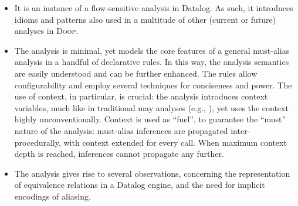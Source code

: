 \vspace{-1mm}
\begin{itemize}
\item It is an instance of a flow-sensitive analysis in Datalog. As such,
  it introduces idioms and patterns also used in a multitude of other
  (current or future) analyses in \textsc{Doop}.
  
\item The analysis is minimal, yet models the core features of a
  general must-alias analysis in a handful of declarative rules.  In
  this way, the analysis semantics are easily understood and can be
  further enhanced. The rules allow configurability and employ several
  techniques for conciseness and power. The use of context, in particular,
  is crucial: the analysis introduces context variables, much like in
  traditional may analyses (e.g., \cite{pldi/KastrinisS13,PGL-014}), yet
  uses the context highly unconventionally. Context is used as ``fuel'',
  to guarantee the ``must'' nature of the analysis: must-alias inferences
  are propagated inter-procedurally, with context extended for every
  call. When maximum context depth is reached, inferences cannot propagate
  any further.

\item The analysis gives rise to several observations, concerning the
  representation of equivalence relations in a Datalog engine,
  and the need for implicit encodings of aliasing.
\end{itemize}


